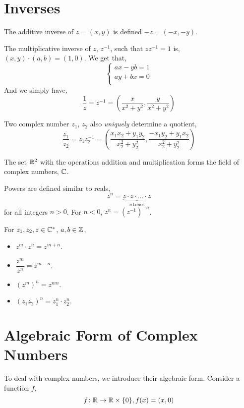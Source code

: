 \section{Inverses}

The additive inverse of \(z = (x, y)\) is defined \(-z = (-x, -y)\). 

The multiplicative inverse of \(z\), \(z^{-1}\), such that \(zz^{-1} = 1\) is,
\((x,y) \cdot (a,b) = (1, 0)\). We get that,
\[
    \begin{cases}
        ax - yb = 1 \\
        ay + bx = 0 \\
    \end{cases}\] 
 And we simply have,
 \[
    \frac{1}{z} = z^{-1} = \left(\frac{x}{x^2 + y^2}, \frac{y}{x^2 + y^2} \right)
\]

Two complex number \(z_1\), \(z_2\) also \emph{uniquely} determine a quotient,
\[\frac{z_1}{z_2} = z_1z_{2}^{-1} = \left(\frac{x_1x_2 + y_1y_2}{x_{2}^{2} + y_{2}^{2}},
\frac{-x_1y_2 + y_1x_2}{x_{2}^{2} + y_{2}^{2}} \right)\]

The set \(\mathbb R^2\) with the operations addition and multiplication forms the field of 
complex numbers, \(\mathbb C\). 

Powers are defined similar to reals,
\[
    z^n = \underbrace{z\cdot z \cdot \dots \cdot z}_{n \, \text{times}}\]%
for all integers \(n > 0\). For \(n < 0\), \(z^{n} = (z^{-1})^{-n}\). 


\begin{proposition}
    For \(z_1, z_2, z \in \mathbb C^*\), \(a, b \in \mathbb Z\),
    \begin{itemize}
        \item \(z^m \cdot z^n = z^{m + n}\).
        \item \(\dfrac{z^m}{z^n} = z^{m-n}\).
        \item \((z^m)^n = z^{mn}\).
        \item \((z_1z_2)^n = z_{1}^n \cdot z_{2}^n\).
    \end{itemize}
\end{proposition}

\section{Algebraic Form of Complex Numbers}

To deal with complex numbers, we introduce their algebraic form. 
Consider a function \(f\),
\[
    f \colon \mathbb R \to \mathbb R \times \{0\}, f(x) = (x, 0)\]%


